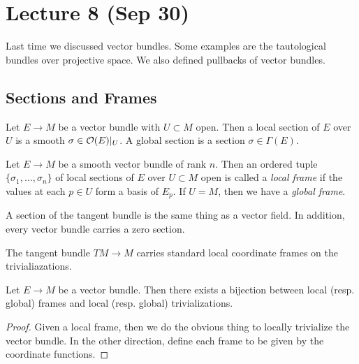 \documentclass[twoside, 10pt]{article}
\begin{document}
    \section{Lecture 8 (Sep 30)}%
    \label{sec:lecture_8_sep_30_}
    
    Last time we discussed vector bundles. Some examples are the tautological bundles over projective space. We also defined pullbacks of vector bundles.

    \subsection{Sections and Frames}%
    \label{sub:sections_and_frames}
    
    Let $E \to M$ be a vector bundle with $U \subset M$ open. Then a local section of $E$ over $U$ is a smooth $\sigma \in \mathcal{O}(E)|_U$. A global section is a section $\sigma \in \Gamma(E)$.

    \begin{defn}
        Let $E \to M$ be a smooth vector bundle of rank $n$. Then an ordered tuple $\{\sigma_1, \ldots, \sigma_n\}$ of local sections of $E$ over $U \subset M$ open is called a \textit{local frame} if the values at each $p \in U$ form a basis of $E_p$. If $U = M$, then we have a \textit{global frame}.
    \end{defn}

    \begin{exm}
        A section of the tangent bundle is the same thing as a vector field. In addition, every vector bundle carries a zero section.
    \end{exm}

    \begin{exm}
        The tangent bundle $TM \to M$ carries standard local coordinate frames on the trivialiazations.
    \end{exm}
    
    \begin{prop}
        Let $E \to M$ be a vector bundle. Then there exists a bijection between local (resp. global) frames and local (resp. global) trivializations.
    \end{prop}

    \begin{proof}
        Given a local frame, then we do the obvious thing to locally trivialize the vector bundle. In the other direction, define each frame to be given by the coordinate functions.
    \end{proof}
\end{document}
